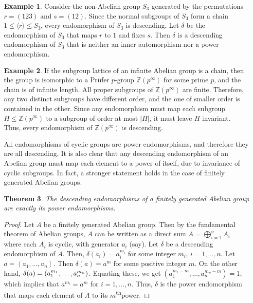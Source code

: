 \documentclass[11pt, a4paper]{article}
\newcommand{\nth}{\textsuperscript{th}}
\newtheorem{Theorem}{Theorem}[section]
\theoremstyle{definition}
\newtheorem{Example}[Theorem]{Example}
\begin{document}
\begin{Example}\label{ex:DescEndS3}
Consider the non-Abelian group $S_3$ generated by the permutations $r = (123)$ and $s = (12)$.  Since the normal subgroups of $S_3$ form a chain $1 \le \langle r \rangle \le S_3$, every endomorphism of $S_3$ is descending. Let $\delta$ be the endomorphism of $S_3$ that maps $r$ to $1$ and fixes $s$. Then $\delta$ is a descending endomorphism of $S_3$ that is neither an inner automorphism nor a power endomorphism.
\end{Example}

\begin{Example}\label{ex:Pruefer}
If the subgroup lattice of an infinite Abelian group is a chain, then the group is isomorphic to a Pr\"ufer $p$-group $\mathbb Z(p^\infty)$ for some prime $p$, and the chain is of infinite length. All proper subgroups of $\mathbb Z(p^\infty)$ are finite. Therefore, any two distinct subgroups have different order, and the one of smaller order is contained in the other. Since any endomorphism must map each subgroup $H \le \mathbb Z(p^\infty)$ to a subgroup of order at most $|H|$, it must leave $H$ invariant. Thus, every endomorphism of $\mathbb Z(p^\infty)$ is descending.
\end{Example}

All endomorphisms of cyclic groups are power endomorphisms, and therefore they are all descending. It is also clear that any descending endomorphism of an Abelian group must map each element to a power of itself, due to invariance of cyclic subgroups. In fact, a stronger statement holds in the case of finitely generated Abelian groups.

\begin{Theorem}\label{thm:FGADescEnd}
The descending endomorphisms of a finitely generated Abelian group are exactly its power endomorphisms.
\end{Theorem}

\begin{proof}
Let $A$ be a finitely generated Abelian group. Then by the fundamental theorem of Abelian groups, $A$ can be written as a direct sum $A = \bigoplus\limits_{i = 1}^n A_i$ where each $A_i$ is cyclic, with generator $a_i$ (say). Let $\delta$ be a descending endomorphism of $A$. Then, $\delta(a_i) = a_i^{m_i}$ for some integer $m_i$, $i = 1, \ldots, n$. Let $a = (a_1, \ldots, a_n)$. Then $\delta(a) = a^m$ for some positive integer $m$. On the other hand, $\delta(a) = \pqty{a_1^{m_1}, \ldots, a_n^{m_n}}$. Equating these, we get $(a_1^{m_1 - m}, \ldots, a_n^{m_n - m}) = 1$, which implies that $a^{m_i} = a^m$ for $i = 1, \ldots, n$. Thus, $\delta$ is the power endomorphism that maps each element of $A$ to its $m$\nth power.
\end{proof}
\end{document}
